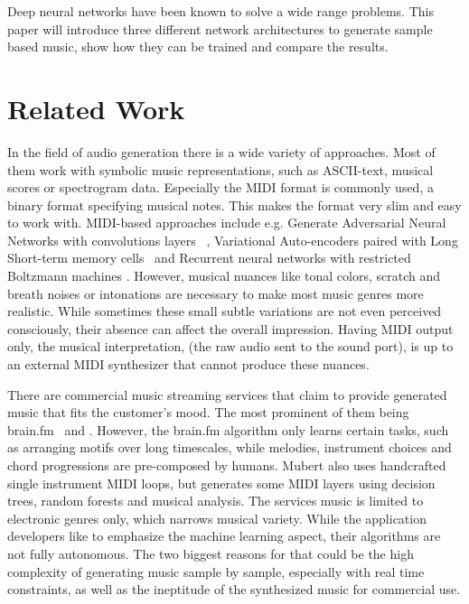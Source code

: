 \documentclass[12pt]{article}
\begin{document}
Deep neural networks have been known to solve a wide range problems.
This paper will introduce three different network architectures to generate sample based music, show how they can be trained and compare the results.


\section{Related Work}
In the field of audio generation there is a wide variety of approaches.
Most of them work with symbolic music representations, such as ASCII-text, musical scores or spectrogram data.
Especially the MIDI format is commonly used, a binary format specifying musical notes.
This makes the format very slim and easy to work with.
MIDI-based approaches include e.g. Generate Adversarial Neural Networks with convolutions layers ~\cite{yang2017midinet, mogren2016c, mogren2016c}, Variational Auto-encoders paired with Long Short-term memory cells~\cite{roberts2018hierarchical, tikhonov2017music, hennig2017classifying} and Recurrent neural networks with restricted Boltzmann machines \cite{boulanger2012modeling}.
However, musical nuances like tonal colors, scratch and breath noises or intonations are necessary to make most music genres more realistic.
While sometimes these small subtle variations are not even perceived consciously, their absence can affect the overall impression. 
Having MIDI output only, the musical interpretation, (the raw audio sent to the sound port), is up to an external MIDI synthesizer that cannot produce these nuances.

There are commercial music streaming services that claim to provide generated music that fits the customer's mood.
The most prominent of them being brain.fm~\cite{brain.fm} and \cite{mubert}.
However, the brain.fm algorithm only learns certain tasks, such as arranging motifs over long timescales, while melodies, instrument choices and chord progressions are pre-composed by humans.
Mubert also uses handcrafted single instrument MIDI loops, but generates some MIDI layers using decision trees, random forests and musical analysis.
The services music is limited to electronic genres only, which narrows musical variety.
While the application developers like to emphasize the machine learning aspect, their algorithms are not fully autonomous.
The two biggest reasons for that could be the high complexity of generating music sample by sample, especially with real time constraints, as well as the ineptitude of the synthesized music for commercial use.
\end{document}
